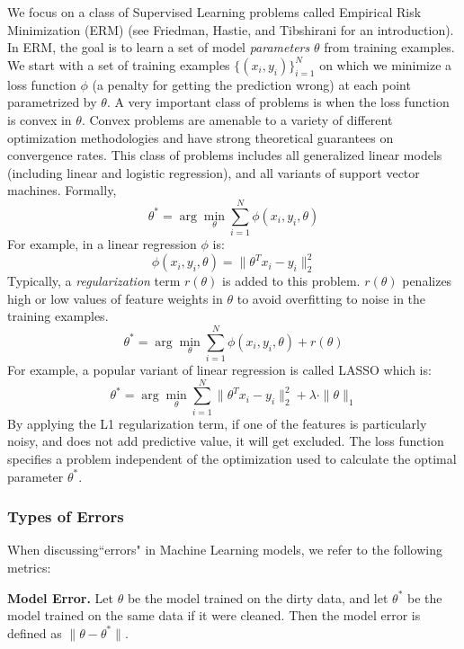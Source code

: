 We focus on a class of Supervised Learning problems called Empirical Risk Minimization (ERM) (see Friedman, Hastie, and Tibshirani \cite{friedman2001elements} for an introduction).
In ERM, the goal is to learn a set of model \emph{parameters} $\theta$ from training examples.
We start with a set of training examples $\{(x_{i},y_{i})\}_{i=1}^{N}$
on which we minimize a loss function $\phi$ (a penalty for getting the prediction wrong) at each point parametrized by $\theta$.
A very important class of problems is when the loss function is convex in $\theta$.
Convex problems are amenable to a variety of different optimization methodologies
and have strong theoretical guarantees on convergence rates.
This class of problems includes all generalized linear models (including linear and logistic regression), and all variants of support vector machines.
Formally,
\[
 \theta^{*}=\arg\min_{\theta}\sum_{i=1}^{N}\phi(x_{i},y_{i},\theta)
\]
For example, in a linear regression $\phi$ is:
\[
\phi(x_{i},y_{i},\theta) = \|\theta^Tx_{i} - y_i \|_2^2
\]
Typically, a \emph{regularization} term $r(\theta)$ is added to this problem.
$r(\theta)$ penalizes high or low values of feature weights in $\theta$ to avoid overfitting to noise in the training examples.
\[
 \theta^{*}=\arg\min_{\theta}\sum_{i=1}^{N}\phi(x_{i},y_{i},\theta) + r(\theta)
\]
For example, a popular variant of linear regression is called LASSO which is:
\[
 \theta^{*}=\arg\min_{\theta}\sum_{i=1}^{N}\|\theta^Tx_{i} - y_i \|_2^2 + \lambda \cdot \|\theta\|_1
\]
By applying the L1 regularization term, if one of the features is particularly noisy, and does not add predictive value, it will get excluded.
The loss function specifies a problem independent of the optimization used to calculate the optimal parameter $\theta^{*}$.

\subsubsection{Types of Errors}
When discussing``errors" in Machine Learning models, we refer to the following metrics:

\vspace{0.5em}

\noindent\textbf{Model Error. } Let $\theta$ be the model trained on the dirty data, and let $\theta^*$ be the model trained on the same data if it were cleaned. Then the model error is defined as $\|\theta - \theta^*\|$.

\vspace{0.5em}

